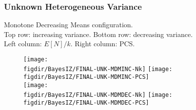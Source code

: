 {\begin{frame}
  \frametitle{Unknown Heterogeneous Variance}
  Monotone Decreasing Means configuration.\\
  Top row: increasing variance.  Bottom row: decreasing variance.\\
  Left column: $E[N]/k$.  Right column: PCS.\\
  \begin{figure}
    \center
    \texttt{[image: \\figdir/BayesIZ/FINAL-UNK-MDMINC-Nk]} \texttt{[image: \\figdir/BayesIZ/FINAL-UNK-MDMINC-PCS]}\\
    \texttt{[image: \\figdir/BayesIZ/FINAL-UNK-MDMDEC-Nk]} \texttt{[image: \\figdir/BayesIZ/FINAL-UNK-MDMDEC-PCS]}\\
  \end{figure}
\end{frame}

}
